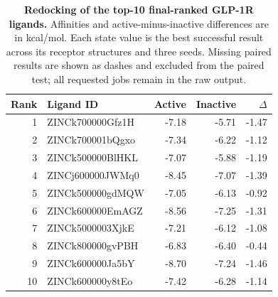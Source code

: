 \begin{table}[tbp]
\centering
\caption{\textbf{Redocking of the top-10 final-ranked GLP-1R ligands.} Affinities and active-minus-inactive differences are in kcal/mol. Each state value is the best successful result across its receptor structures and three seeds. Missing paired results are shown as dashes and excluded from the paired test; all requested jobs remain in the raw output.}
\label{tab:top10_docking}
\footnotesize
\setlength{\tabcolsep}{4pt}
\begin{tabular}{@{}rlrrr@{}}
\toprule
Rank & Ligand ID & Active & Inactive & $\Delta$ \\
\midrule
1 & ZINCk700000Gfz1H & -7.18 & -5.71 & -1.47 \\
2 & ZINCk700001bQgxo & -7.34 & -6.22 & -1.12 \\
3 & ZINCk500000BlHKL & -7.07 & -5.88 & -1.19 \\
4 & ZINCj600000JWMq0 & -8.45 & -7.07 & -1.39 \\
5 & ZINCk500000gdMQW & -7.05 & -6.13 & -0.92 \\
6 & ZINCk600000EmAGZ & -8.56 & -7.25 & -1.31 \\
7 & ZINCk5000003XjkE & -7.21 & -6.12 & -1.08 \\
8 & ZINCk800000gvPBH & -6.83 & -6.40 & -0.44 \\
9 & ZINCk600000Ja5bY & -8.70 & -7.24 & -1.46 \\
10 & ZINCk600000y8tEo & -7.42 & -6.28 & -1.14 \\
\bottomrule
\end{tabular}
\end{table}
